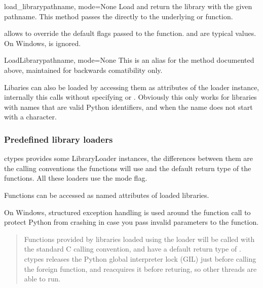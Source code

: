 \begin{funcdesc}{load_library}{pathname, mode=None}
Load and return the library with the given pathname.  This method
passes the  directly to the underlying  or
 function.

 allows to override the default flags passed to the
 function.   and  are
typical values.  On Windows,  is ignored.
\end{funcdesc}

\begin{funcdesc}{LoadLibrary}{pathname, mode=None}
This is an alias for the  method documented above,
maintained for backwards comatibility only.
\end{funcdesc}

Libaries can also be loaded by accessing them as attributes of the
loader instance, internally this calls  without
specifying  or .  Obviously this only works for
libraries with names that are valid Python identifiers, and when the
name does not start with a \code{{\_}} character.


\subsubsection{Predefined library loaders\label{ctypes-predefined-library-loaders}}

ctypes provides some LibraryLoader instances, the differences between
them are the calling conventions the functions will use and the
default return type of the functions.  All these loaders use the
 mode flag.

Functions can be accessed as named attributes of loaded libraries.

On Windows, structured exception handling is used around the function
call to protect Python from crashing in case you pass invalid
parameters to the function.

\begin{quote}

Functions provided by libraries loaded using the  loader
will be called with the standard C calling convention, and have a
default return type of .  ctypes releases the Python global
interpreter lock (GIL) just before calling the foreign function,
and reacquires it before returing, so other threads are able to
run.
\end{quote}

